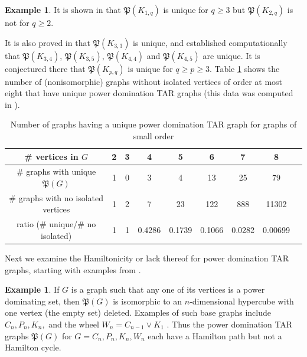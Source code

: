 \documentclass{article}
\numberwithin{figure}{section}
\numberwithin{table}{section}
\numberwithin{equation}{section}
\theoremstyle{definition}
\theoremstyle{definition}
\theoremstyle{definition}
\newtheorem{ex}[thm]{Example}
\newcommand{\pdtar}{\mathfrak{P}}%
\begin{document}
{%
\begin{ex}
It is shown in \cite[Section 3.3]{PDrecon} that $\pdtar(K_{1,q})$ is unique for $q\ge 3$ but  $\pdtar(K_{2,q})$ is not for $q\ge 2$.   
\end{ex}
It is also proved in \cite{PDrecon} that $\pdtar(K_{3,3})$ is unique, and established computationally that $\pdtar(K_{3,4})$, $\pdtar(K_{3,5})$, $\pdtar(K_{4,4})$ and $\pdtar(K_{4,5})$ are unique.  It is conjectured there that $\pdtar(K_{p,q})$ is unique for $q\ge p\ge 3$. 
Table \ref{t:unique-tar-data-PD} shows the number of (nonisomorphic) graphs without isolated vertices of order at most  eight  that have  unique  power domination TAR graphs (this data was computed in \cite{sage:recon}).\begin{table}[!h]
\begin{center}
\begin{tabular}{ |c|c|c|c|c|c|c|c|c| } 
 \hline
\#  vertices in $G$  & 2 & 3 & 4 & 5 & 6 & 7 
 & 8\\
\hline
\# graphs with  unique $\pdtar(G)$  & 1 & 0 & 3 &4 & 13 & 25 &  
79\\
  \hline
\# graphs with no isolated vertices  & 1 & 2 & 7 & 23 & 122 & 888 & 11302\\
 \hline
 ratio (\# unique/\# no isolated) &  1 & 1 & 0.4286 & 0.1739 &  0.1066 &  0.0282 & 0.00699\\
 \hline\end{tabular}\vspace{-9pt}
\end{center}
    \caption{Number of graphs having a unique power domination TAR graph for graphs of  small order}
    \label{t:unique-tar-data-PD}
\end{table}%

 Next we examine the Hamiltonicity or lack thereof for power domination TAR graphs,  starting with examples from \cite{PDrecon}.
\begin{ex}  If $G$ is a graph such that any one of its vertices is a power dominating set, then $\pdtar(G)$ is isomorphic to an $n$-dimensional hypercube with one vertex (the empty set) deleted.  Examples of such base graphs include $C_n, P_n, K_n,$ and the wheel $W_n=C_{n-1}\vee K_1$ \cite{PDrecon}.  Thus the power domination TAR graphs $\pdtar(G)$ for $G=C_n, P_n, K_n,W_n$ each have a Hamilton path but not a Hamilton cycle.
\end{ex}



}
\end{document}
